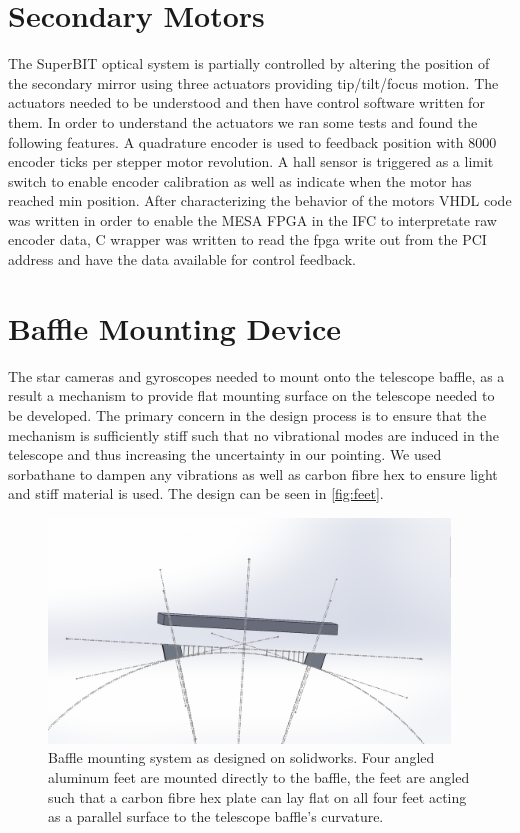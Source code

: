 \section{Secondary Motors}
The SuperBIT optical system is partially controlled by altering the position of the secondary mirror using three actuators providing tip/tilt/focus motion. The actuators needed to be understood and then have control software written for them. In order to understand the actuators we ran some tests and found the following features. A quadrature encoder is used to feedback position with 8000 encoder ticks per stepper motor revolution. A hall sensor is triggered as a limit switch to enable encoder calibration as well as indicate when the motor has reached min position. After characterizing the behavior of the motors VHDL code was written in order to enable the MESA FPGA in the IFC to interpretate raw encoder data, C wrapper was written to read the fpga write out from the PCI address and have the data available for control feedback.

\section{Baffle Mounting Device}
The star cameras and gyroscopes needed to mount onto the telescope baffle, as a result a mechanism to provide flat mounting surface on the telescope needed to be developed. The primary concern in the design process is to ensure that the mechanism is sufficiently stiff such that no vibrational modes are induced in the telescope and thus increasing the uncertainty in our pointing. We used sorbathane to dampen any vibrations as well as carbon fibre hex to ensure light and stiff material is used. The design can be seen in \autoref{fig:feet}.

\begin{figure}
    \begin{small}
        \begin{center}
            \includegraphics[width=0.95\textwidth]{Hardware/figs/baffle_mount.png}
        \end{center}
        \caption{Baffle mounting system as designed on solidworks. Four angled aluminum feet are mounted directly to the baffle, the feet are angled such that a carbon fibre hex plate can lay flat on all four feet acting as a parallel surface to the telescope baffle's curvature.}
        \label{fig:feet}
    \end{small}
\end{figure}


